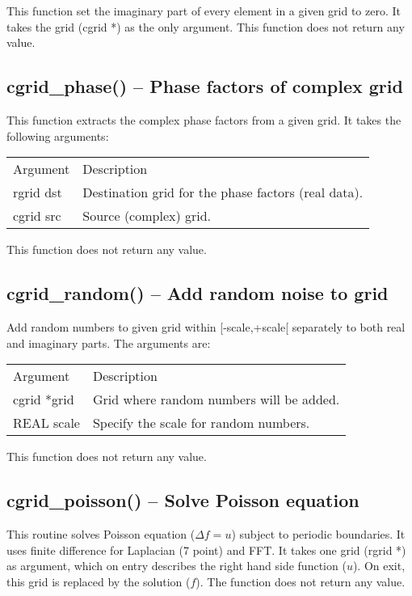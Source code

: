 \documentclass[12pt,letterpaper]{report}
\begin{document}
This function set the imaginary part of every element in a given grid to zero. It takes the grid (cgrid *) as the only argument. This function does not return any value.

\subsection{cgrid\_phase() -- Phase factors of complex grid}

This function extracts the complex phase factors from a given grid. It takes the following arguments:
\begin{longtable}{p{} p{}}
Argument & Description\\
\cline{1-2}
rgrid dst & Destination grid for the phase factors (real data).\\ 
cgrid src & Source (complex) grid.\\
\end{longtable}
\noindent
This function does not return any value.

\subsection{cgrid\_random() -- Add random noise to grid}

Add random numbers to given grid within [-scale,+scale[ separately to both real and imaginary parts. The arguments are:
\begin{longtable}{p{} p{}}
Argument & Description\\
\cline{1-2}
cgrid *grid & Grid where random numbers will be added.\\
REAL scale & Specify the scale for random numbers.\\
\end{longtable}
\noindent
This function does not return any value. 

\subsection{cgrid\_poisson() -- Solve Poisson equation}

This routine solves Poisson equation ($\Delta f = u$) subject to periodic boundaries. It
uses finite difference for Laplacian (7 point) and FFT. It takes one grid (rgrid *) as argument, which on entry describes the right hand side function ($u$). On exit, this grid is replaced by the solution ($f$). The function does not return any value.
\end{document}
